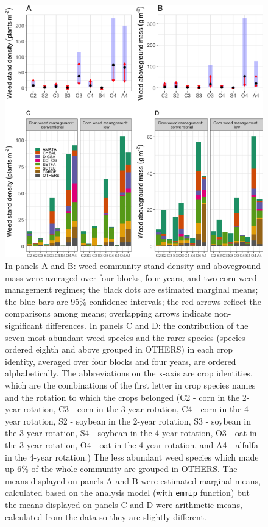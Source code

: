 \documentclass[
]{article}
\begin{document}
\begin{figure}
\centering
\includegraphics{Community_files/figure-latex/all-sp-dens-biom-1.png}
\caption{\label{fig:all-sp-dens-biom}In panels A and B: weed community stand density and aboveground mass were averaged over four blocks, four years, and two corn weed management regimes; the black dots are estimated marginal means; the blue bars are 95\% confidence intervals; the red arrows reflect the comparisons among means; overlapping arrows indicate non-significant differences. In panels C and D: the contribution of the seven most abundant weed species and the rarer species (species ordered eighth and above grouped in OTHERS) in each crop identity, averaged over four blocks and four years, are ordered alphabetically. The abbreviations on the x-axis are crop identities, which are the combinations of the first letter in crop species names and the rotation to which the crops belonged (C2 - corn in the 2-year rotation, C3 - corn in the 3-year rotation, C4 - corn in the 4-year rotation, S2 - soybean in the 2-year rotation, S3 - soybean in the 3-year rotation, S4 - soybean in the 4-year rotation, O3 - oat in the 3-year rotation, O4 - oat in the 4-year rotation, and A4 - alfalfa in the 4-year rotation.) The less abundant weed species which made up 6\% of the whole community are grouped in OTHERS. The means displayed on panels A and B were estimated marginal means, calculated based on the analysis model (with \texttt{emmip} function) but the means displayed on panels C and D were arithmetic means, calculated from the data so they are slightly different.}
\end{figure}
\end{document}
